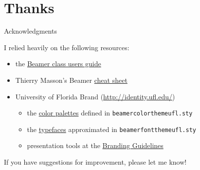\documentclass{beamer}
\begin{document}
\section{Thanks}


\begin{frame}{Acknowledgments}
\label{slide:acknowledgments}

I relied heavily on the following resources:
\begin{itemize}
\item the \href{http://texdoc.net/texmf-dist/doc/latex/beamer/doc/beameruserguide.pdf}{Beamer class users guide}
\item Thierry Masson's Beamer \href{http://www.cpt.univ-mrs.fr/~masson/latex/Beamer-appearance-cheat-sheet.pdf}{cheat sheet}
\item University of Florida Brand (\url{http://identity.ufl.edu/})
\begin{itemize}
\item the \href{http://identity.ufl.edu/color/}{color palettes} defined in {\tt beamercolorthemeufl.sty}
\item the \href{http://identity.ufl.edu/typography/}{typefaces} approximated in {\tt beamerfontthemeufl.sty}
\item presentation tools at the \href{http://identity.ufl.edu/our-brand/}{Branding Guidelines}
\end{itemize}
\end{itemize}

\vfill
If you have suggestions for improvement, please let me know!

\center\href{https://github.com/corybrunson/beamerthemeufl/issues}{}

\end{frame}
\end{document}
